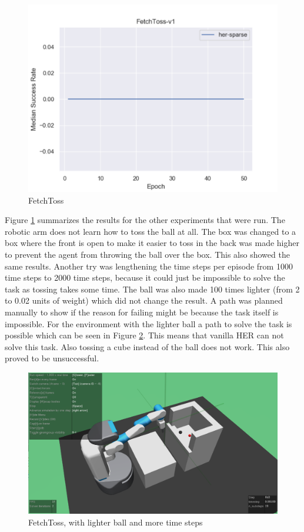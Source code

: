 \begin{figure} [!ht]
	
	\centering
	\includegraphics[width=1\textwidth]{figures/fig_FetchToss-v1.pdf}
	\caption{FetchToss}
	\label{toss2}
\end{figure}

Figure \ref{toss2} summarizes the results for the other experiments that were run. The robotic arm does not learn how to toss the ball at all. The box was changed to a box where the front is open to make it easier to toss in the back was made higher to prevent the agent from throwing the ball over the box. This also showed the same results. Another try was lengthening the time steps per episode from 1000 time steps to 2000 time steps, because it could just be impossible to solve the task as tossing takes some time. The ball was also made 100 times lighter (from 2 to 0.02 units of weight) which did not change the result. A path was planned manually to show if the reason for failing might be because the task itself is impossible. For the environment with the lighter ball a path to solve the task is possible which can be seen in Figure \ref{toss3}. This means that vanilla HER can not solve this task. Also tossing a cube instead of the ball does not work. This also proved to be unsuccessful. 

\begin{figure} [!h]
	
	\centering
	\includegraphics[width=1\textwidth]{figures/FetchToss-v0.pdf}
	\caption{FetchToss, with lighter ball and more time steps}
	\label{toss3}
\end{figure}

